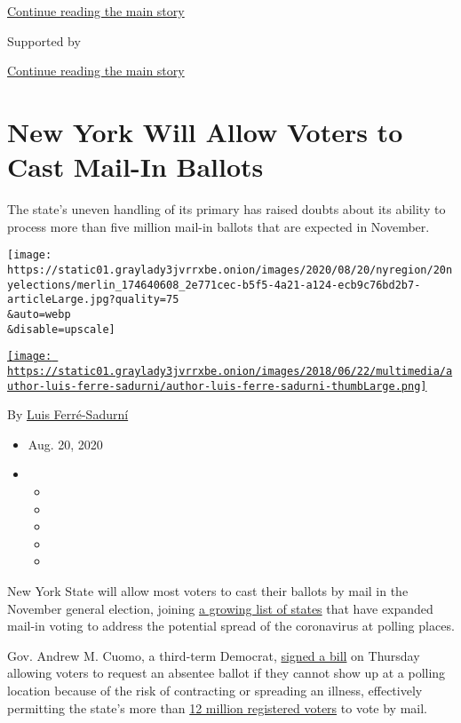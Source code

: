 \protect\hyperlink{after-top}{Continue reading the main story}

Supported by

\protect\hyperlink{after-sponsor}{Continue reading the main story}

\hypertarget{new-york-will-allow-voters-to-cast-mail-in-ballots}{%
\section{New York Will Allow Voters to Cast Mail-In
Ballots}\label{new-york-will-allow-voters-to-cast-mail-in-ballots}}

The state's uneven handling of its primary has raised doubts about its
ability to process more than five million mail-in ballots that are
expected in November.

\texttt{[image: https://static01.graylady3jvrrxbe.onion/images/2020/08/20/nyregion/20nyelections/merlin\_174640608\_2e771cec-b5f5-4a21-a124-ecb9c76bd2b7-articleLarge.jpg?quality=75\\\&auto=webp\\\&disable=upscale]}

\href{https://www.nytimes3xbfgragh.onion/by/luis-ferre-sadurni}{\texttt{[image: https://static01.graylady3jvrrxbe.onion/images/2018/06/22/multimedia/author-luis-ferre-sadurni/author-luis-ferre-sadurni-thumbLarge.png]}}

By \href{https://www.nytimes3xbfgragh.onion/by/luis-ferre-sadurni}{Luis
Ferré-Sadurní}

\begin{itemize}
\item
  Aug. 20, 2020
\item
  \begin{itemize}
  \item
  \item
  \item
  \item
  \item
  \end{itemize}
\end{itemize}

New York State will allow most voters to cast their ballots by mail in
the November general election, joining
\href{https://www.nytimes3xbfgragh.onion/interactive/2020/08/11/us/politics/vote-by-mail-us-states.html}{a
growing list of states} that have expanded mail-in voting to address the
potential spread of the coronavirus at polling places.

Gov. Andrew M. Cuomo, a third-term Democrat,
\href{https://www.nysenate.gov/legislation/bills/2019/s8015}{signed a
bill} on Thursday allowing voters to request an absentee ballot if they
cannot show up at a polling location because of the risk of contracting
or spreading an illness, effectively permitting the state's more than
\href{https://www.elections.ny.gov/NYSBOE/enrollment/county/county_feb19.pdf}{12
million registered voters} to vote by mail.


